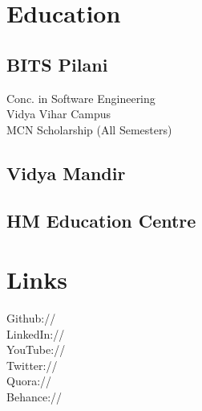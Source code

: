 \documentclass[]{deedy-resume-openfont}
\begin{document}
%
%



%
%

\begin{minipage}[t]{0.33\textwidth} 


\section{Education} 
\subsection{BITS Pilani}
Conc. in Software Engineering \\
Vidya Vihar Campus \\
MCN Scholarship (All Semesters) \\
\sectionsep

\subsection{Vidya Mandir}
\sectionsep

\subsection{HM Education Centre}
\sectionsep


\section{Links} 
Github:// \href{https://github.com/sarweshshah}{} \\
LinkedIn://  \href{https://www.linkedin.com/in/sarweshshah/}{} \\
YouTube://  \href{https://www.youtube.com/c/SarweshShah}{} \\
Twitter://  \href{https://twitter.com/sarweshshah}{} \\
Quora://  \href{https://www.quora.com/profile/Sarwesh-Shah}{}\\
Behance:// \href{https://www.behance.net/sarweshshah}{}
\sectionsep


\end{minipage}
\end{document}
